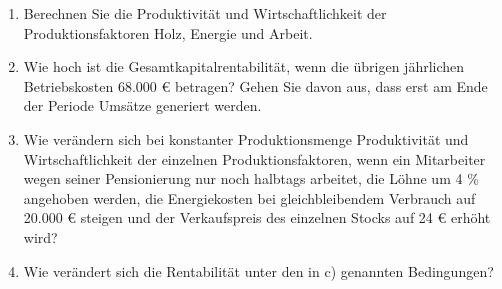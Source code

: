 \begin{enumerate}[label=(\alph*)]
  \item Berechnen Sie die Produktivität und Wirtschaftlichkeit der Produktionsfaktoren Holz, Energie und Arbeit.
  \item Wie hoch ist die Gesamtkapitalrentabilität, wenn die übrigen jährlichen Betriebskosten 68.000 € betragen? Gehen Sie davon aus, dass erst am Ende der Periode Umsätze generiert werden.
  \item Wie verändern sich bei konstanter Produktionsmenge Produktivität und Wirtschaftlichkeit der einzelnen Produktionsfaktoren, wenn ein Mitarbeiter wegen seiner Pensionierung nur noch halbtags arbeitet, die Löhne um 4 \% angehoben werden, die Energiekosten bei gleichbleibendem Verbrauch auf 20.000 € steigen und der Verkaufspreis des einzelnen Stocks auf 24 € erhöht wird?
  \item Wie verändert sich die Rentabilität unter den in c) genannten Bedingungen?
\end{enumerate}

